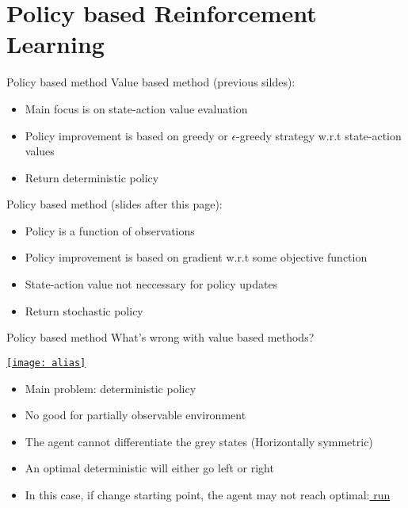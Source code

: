 \graphicspath{{./figs/repo/}{./figs/}}
\section{Policy based Reinforcement Learning}



\begin{frame}{Policy based method}
    Value based method (previous sildes):
    \begin{itemize}
        \item Main focus is on state-action value evaluation
        \item Policy improvement is based on greedy or $\epsilon$-greedy strategy w.r.t state-action values
        \item Return deterministic policy
    \end{itemize}\vspace{0.5cm}
    Policy based method (slides after this page):
    \begin{itemize}
        \item Policy is a function of observations
        \item Policy improvement is based on gradient w.r.t some objective function
        \item State-action value not neccessary for policy updates
        \item Return stochastic policy
    \end{itemize}
\end{frame}

\begin{frame}{Policy based method}
    What's wrong with value based methods?\\\vspace{0.2cm}
    \begin{center} \href{https://www.youtube.com/watch?v=pKkbf9hnvXY}{\texttt{[image: alias]}}\end{center}
    \begin{itemize}
        \item Main problem: deterministic policy
        \item No good for partially observable environment
        \item The agent cannot differentiate the grey states (Horizontally symmetric)
        \item An optimal deterministic will either go left or right 
        \item In this case, if change starting point, the agent may not reach optimal:\href{https://www.youtube.com/watch?v=hCnGoKwcAhQ}{ run}
    \end{itemize}
\end{frame}

